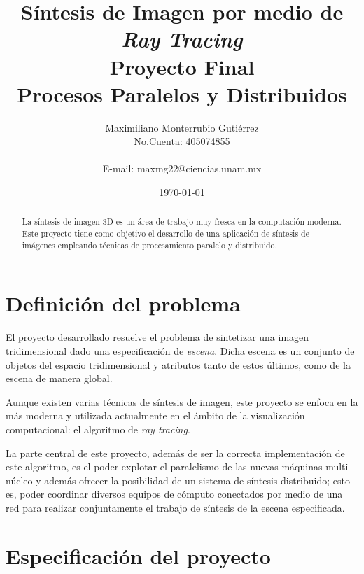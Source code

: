 \documentclass[]{article}
\begin{document}
\ifpdf
{}
\else
{}
\fi


\title{Síntesis de Imagen por medio de \emph{Ray Tracing} \\ Proyecto Final \\ Procesos Paralelos y Distribuidos}
\author{Maximiliano Monterrubio Gutiérrez\\No.Cuenta: 405074855\\\\E-mail: maxmg22@ciencias.unam.mx}
\date{\today}

{\sffamily \maketitle}

\begin{abstract}
 La síntesis de imagen 3D es un área de trabajo muy fresca en la computación moderna.  Este proyecto tiene como objetivo el 
desarrollo de una aplicación de síntesis de imágenes empleando técnicas de procesamiento paralelo y distribuido.
\end{abstract}

\section{Definición del problema}

El proyecto desarrollado resuelve el problema de sintetizar una imagen tridimensional dado una especificación de \emph{escena}.  Dicha escena es un conjunto de objetos del espacio tridimensional y atributos tanto de estos últimos, como de la escena de manera global.  

Aunque existen varias técnicas de síntesis de imagen, este proyecto se enfoca en la más moderna y utilizada actualmente en el ámbito de la visualización computacional: el algoritmo de \emph{ray tracing}.

La parte central de este proyecto, además de ser la correcta implementación de este algoritmo, es el poder explotar el paralelismo de las nuevas máquinas multi-núcleo y además ofrecer la posibilidad de un sistema de síntesis distribuido; esto es, poder coordinar diversos equipos de cómputo conectados por medio de una red para realizar conjuntamente el trabajo de síntesis de la escena especificada.

\section{Especificación del proyecto}
\end{document}

